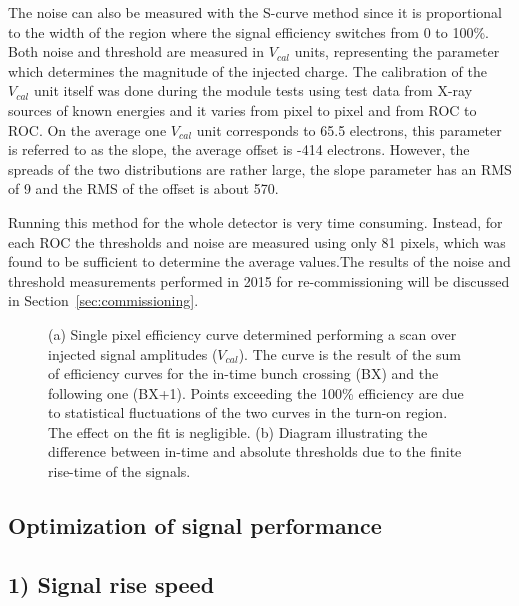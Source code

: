 The noise can also be measured with the S-curve method since it is proportional to the width of the region where the signal efficiency switches from 0 to 100\%.
Both noise and threshold are measured in $V_{cal}$ units, representing the parameter which determines the magnitude of the injected charge.
The calibration of the $V_{cal}$ unit itself was done during the module tests using test data from X-ray sources of known energies and it varies from pixel to pixel and from ROC to ROC.
On the average one $V_{cal}$ unit corresponds to 65.5 electrons, this parameter is referred to as the slope, the average offset is -414 electrons.
However, the spreads of the two distributions are rather large, the slope parameter has an RMS of 9 and the RMS of the offset is about 570.

Running this method for the whole detector is very time consuming. Instead, for each ROC the thresholds and noise are measured using only 81 pixels, which was found to be sufficient to determine the average values.The results of the noise and threshold measurements performed in 2015 for re-commissioning will be discussed in Section~\ref{sec:commissioning}.

\begin{figure}[!htb]
 \begin{center}
 \end{center}
 \caption{(a) Single pixel efficiency curve determined performing a scan over injected signal amplitudes ($V_{cal}$). The curve is the result of the sum of efficiency curves for the in-time bunch crossing (BX) and the following one (BX+1). Points exceeding the 100\% efficiency are due to statistical fluctuations of the two curves in the turn-on region. The effect on the fit is negligible. (b) Diagram illustrating the difference between in-time and absolute thresholds due to the finite rise-time of the signals.}
 \label{fig:SCurve}
\end{figure}

\subsection{Optimization of signal performance}\label{subsec:calibPart2}

\subsection*{1) Signal rise speed}

